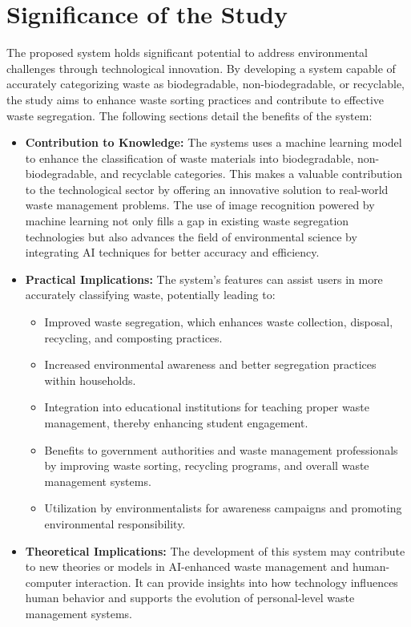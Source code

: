 \section{Significance of the Study}
The proposed system holds significant potential to address environmental challenges through technological innovation. By developing a system capable of accurately categorizing waste as biodegradable, non-biodegradable, or recyclable, the study aims to enhance waste sorting practices and contribute to effective waste segregation. The following sections detail the benefits of the system:

\begin{itemize}
	\item \textbf{Contribution to Knowledge:} The systems uses a machine learning model to enhance the classification of waste materials into biodegradable, non-biodegradable, and recyclable categories. This makes a valuable contribution to the technological sector by offering an innovative solution to real-world waste management problems. The use of image recognition powered by machine learning not only fills a gap in existing waste segregation technologies but also advances the field of environmental science by integrating AI techniques for better accuracy and efficiency.
	
	\item \textbf{Practical Implications:} The system’s features can assist users in more accurately classifying waste, potentially leading to:
	\begin{itemize}
		\item Improved waste segregation, which enhances waste collection, disposal, recycling, and composting practices.
		\item Increased environmental awareness and better segregation practices within households.
		\item Integration into educational institutions for teaching proper waste management, thereby enhancing student engagement.
		\item Benefits to government authorities and waste management professionals by improving waste sorting, recycling programs, and overall waste management systems.
		\item Utilization by environmentalists for awareness campaigns and promoting environmental responsibility.
	\end{itemize}
	
	\item \textbf{Theoretical Implications:} The development of this system may contribute to new theories or models in AI-enhanced waste management and human-computer interaction. It can provide insights into how technology influences human behavior and supports the evolution of personal-level waste management systems.
	

\end{itemize}
